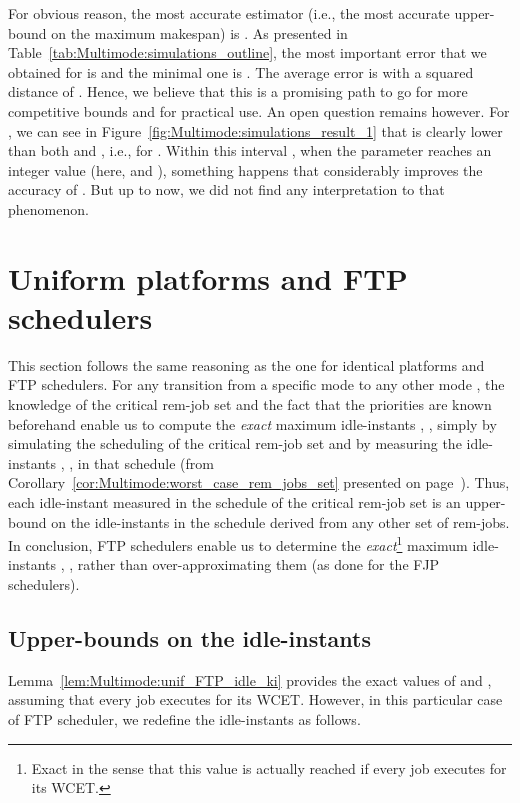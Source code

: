 \documentclass{article}
\newtheorem{validity test}{Validity Test}
\begin{document}
For obvious reason, the most accurate estimator (i.e., the most accurate upper-bound on the maximum makespan) is . As presented in Table~\ref{tab:Multimode:simulations_outline}, the most important error that we obtained for  is  and the minimal one is . The average error is  with a squared distance of . Hence, we believe that this is a promising path to go for more competitive bounds and for practical use. An open question remains however. For , we can see in Figure~\ref{fig:Multimode:simulations_result_1} that  is clearly lower than both  and , i.e.,  for . Within this interval , when the parameter  reaches an integer value (here,  and ), something happens that considerably improves the accuracy of . But up to now, we did not find any interpretation to that phenomenon. 



\section{Uniform platforms and FTP schedulers}
\label{sec:Multimode:unif_FTP}

This section follows the same reasoning as the one for identical platforms and FTP schedulers. For any transition from a specific mode  to any other mode , the knowledge of the critical rem-job set  and the fact that the priorities are known beforehand enable us to compute the \emph{exact} maximum idle-instants , , simply by simulating the scheduling of the critical rem-job set and by measuring the idle-instants , , in that schedule (from Corollary~\ref{cor:Multimode:worst_case_rem_jobs_set} presented on page~\pageref{cor:Multimode:worst_case_rem_jobs_set}). Thus, each idle-instant  measured in the schedule of the critical rem-job set is an upper-bound on the idle-instants  in the schedule derived from any other set of rem-jobs. In conclusion, FTP schedulers enable us to determine the \emph{exact}\footnote{Exact in the sense that this value is actually reached if every job executes for its WCET.} maximum idle-instants , , rather than over-approximating them (as done for the FJP schedulers). 

\subsection{Upper-bounds  on the idle-instants}
\label{sec:Multimode:unif_FTP_upper_bounds}

Lemma~\ref{lem:Multimode:unif_FTP_idle_ki} provides the exact values of   and , assuming that every job  executes for its WCET. However, in this particular case of FTP scheduler, we redefine the idle-instants  as follows.
\end{document}
